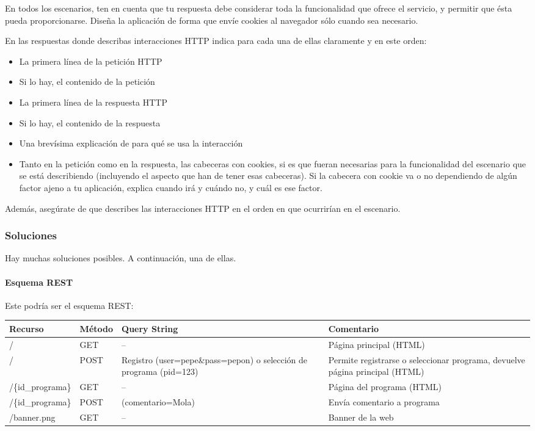 En todos los escenarios, ten en cuenta que tu respuesta debe considerar toda la funcionalidad que ofrece el servicio, y permitir que ésta pueda proporcionarse. Diseña la aplicación de forma que envíe cookies al navegador sólo cuando sea necesario.

En las respuestas donde describas interacciones HTTP indica para cada una de ellas claramente y en este orden:
  \begin{itemize}
  \item La primera línea de la petición HTTP
  \item Si lo hay, el contenido de la petición
  \item La primera línea de la respuesta HTTP
  \item Si lo hay, el contenido de la respuesta
  \item Una brevísima explicación de para qué se usa la interacción
  \item Tanto en la petición como en la respuesta, las cabeceras con cookies, si es que fueran necesarias para la funcionalidad del escenario que se está describiendo (incluyendo el aspecto que han de tener esas cabeceras). Si la cabecera con cookie va o no dependiendo de algún factor ajeno a tu aplicación, explica cuando irá y cuándo no, y cuál es ese factor.
  \end{itemize}

Además, asegúrate de que describes las interacciones HTTP en el orden en que ocurrirían en el escenario.


\subsubsection{Soluciones}

Hay muchas soluciones posibles. A continuación, una de ellas.

\paragraph{Esquema REST}

Este podría ser el esquema REST:

\begin{tabular}{|l|l|p{5cm}|p{5cm}|}
  \hline
  Recurso & Método & Query String & Comentario \\ \hline \hline
  /       & GET    & -- & Página principal (HTML) \\
  /       & POST   & Registro (user=pepe\&pass=pepon) o selección de programa (pid=123) & Permite registrarse o seleccionar programa, devuelve página principal (HTML) \\ \hline
  /\{id\_programa\} & GET & -- & Página del programa (HTML) \\ 
  /\{id\_programa\} & POST & (comentario=Mola) & Envía comentario a programa \\ \hline
  /banner.png & GET & -- & Banner de la web \\ \hline
\end{tabular}

